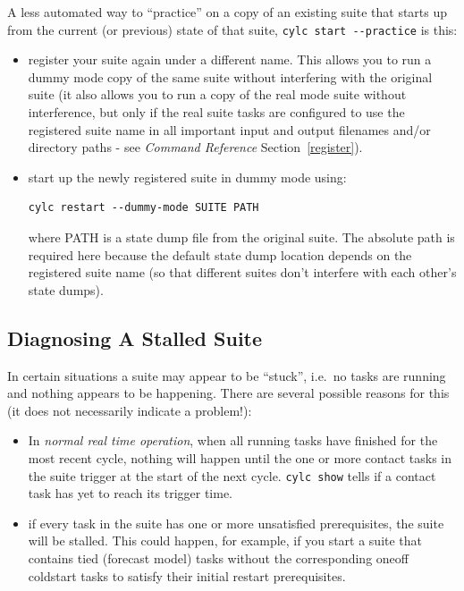 \documentclass[11pt,a4paper]{article}
\begin{document}
A less automated way to ``practice'' on a copy of an existing suite
that starts up from the current (or previous) state of that suite, 
\lstinline=cylc start --practice= is this:

\begin{itemize}
    \item register your suite again under a different name. This allows
        you to run a dummy mode copy of the same suite without
        interfering with the original suite (it also allows you to run
        a copy of the real mode suite without interference, but only if
        the real suite tasks are configured to use the registered
        suite name in all important input and output filenames and/or
        directory paths - see {\em Command Reference} Section~\ref{register}).

    \item start up the newly registered suite in dummy mode using:
        \begin{lstlisting}
cylc restart --dummy-mode SUITE PATH
        \end{lstlisting}
        where PATH is a state dump file from the original suite. The
        absolute path is required here because the default state
        dump location depends on the registered suite name (so that
        different suites don't interfere with each other's state
        dumps).

\end{itemize}

\subsection{Diagnosing A Stalled Suite}
\label{DiagnosingAStalledSuite}

In certain situations a suite may appear to be ``stuck'', i.e.\ no
tasks are running and nothing appears to be happening. There are several 
possible reasons for this (it does not necessarily indicate a problem!):

\begin{itemize}
    \item In {\em normal real time operation}, when all running tasks
        have finished for the most recent cycle, nothing will happen
        until the one or more contact tasks in the suite trigger at the
        start of the next cycle. \lstinline=cylc show= tells if a
        contact task has yet to reach its trigger time.

    \item if every task in the suite has one or more unsatisfied
        prerequisites, the suite will be stalled. This could happen,
        for example, if you start a suite that contains tied (forecast
        model) tasks without the corresponding oneoff coldstart tasks to
        satisfy their initial restart prerequisites.

\end{itemize}
\end{document}

